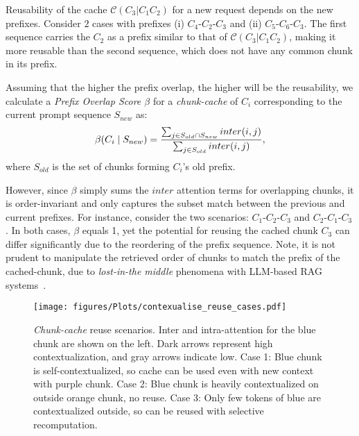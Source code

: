 Reusability of the cache $\mathscr{C}(C_3 | C_1C_2)$ for a new request depends on the new prefixes.
Consider $2$ cases with prefixes (i) $C_{4}$-$C_{2}$-$C_{3}$ and (ii) $C_{5}$-$C_{6}$-$C_{3}$. The first sequence carries the $C_2$ as a prefix similar to that of $\mathscr{C}(C_3 | C_1C_2)$, making it more reusable than the second sequence, which does not have any common chunk in its prefix. 


Assuming that the higher the prefix overlap, the higher will be the reusability,
we calculate a 
\textit{Prefix Overlap Score $\beta$} for a \textit{chunk-cache} of $C_i$ corresponding to the current prompt sequence $S_{new}$ as:
\begin{align}
    \small
\beta(C_i \mid S_{new}) = \frac{\sum_{j \in S_{old} \cap S_{new}} inter(i,j)}{\sum_{j \in S_{old}} inter(i,j)},
\end{align}
where $S_{old}$ is the set of chunks forming $C_i$'s old prefix.

  
However, since $\beta$ simply sums the $inter$ attention terms for overlapping chunks, it is order-invariant and only captures the subset match between the previous and current prefixes. 
For instance, consider the two scenarios: \(C_{1}\)-\(C_{2}\)-\(C_{3}\) and \(C_{2}\)-\(C_{1}\)-\(C_{3}\). 
In both cases, $\beta$ equals 1, yet the potential for reusing the cached chunk \(C_{3}\) can differ significantly due to the reordering of the prefix sequence. 
Note, it is not prudent to manipulate the retrieved order of chunks to match the prefix of the cached-chunk, due to \textit{lost-in-the middle} phenomena with LLM-based RAG systems~\cite{liu2024lost}.

\begin{figure}[t]
    \centering
    \texttt{[image: figures/Plots/contexualise\_reuse\_cases.pdf]}
    \caption{\textit{Chunk-cache} reuse scenarios. Inter and intra-attention for the blue chunk are shown on the left. Dark arrows represent high contextualization, and gray arrows indicate low. Case 1: Blue chunk is self-contextualized, so cache can be used even with new context with purple chunk. Case 2: Blue chunk is heavily contextualized on outside orange chunk, no reuse. Case 3: Only few tokens of blue are contextualized outside, so can be reused with selective recomputation.
    }
    \label{fig:contexual_cases}
\end{figure}



